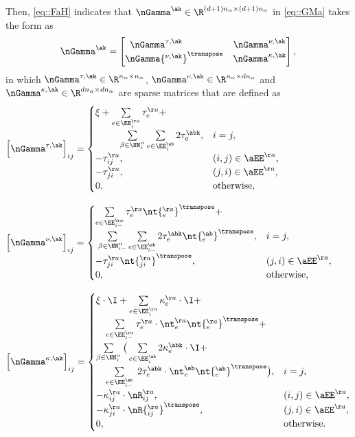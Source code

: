Then, \cref{eq::FaH} indicates that $\nGamma^{\ak}\in \R^{(d+1)n_\alpha\times (d+1)n_\alpha}$ in \cref{eq::GMa} takes the form as
\begin{equation}\label{eq::nGamma}
\nGamma^{\ak}=\begin{bmatrix}
\nGamma^{\tau,\ak}\hphantom{{}^\transpose} & \nGamma^{\nu,\ak}\\
\nGamma{\vphantom{H}^{\nu,\ak}}^\transpose & \nGamma^{\kappa,\ak}
\end{bmatrix},
\end{equation}
in which $\nGamma^{\tau,\ak}\in \R^{n_\alpha\times n_\alpha}$, $\nGamma^{\nu,\ak}\in\R^{n_\alpha\times dn_\alpha}$ and $\nGamma^{\kappa,\ak}\in\R^{dn_\alpha\times dn_\alpha}$ are sparse matrices that are defined as
\begingroup
\allowdisplaybreaks
\begin{align*}
&\Big[\nGamma^{\tau,\ak}\Big]_{ij}=\begin{cases}
\xi + \sum\limits_{e\in \EE_i^{\aa}}\tau_{e}^{\aa}+\\
\quad\quad\;\;\sum\limits_{\substack{\beta\in \NN_i^\alpha}}\sum\limits_{e\in \EE_i^{\ab}}2\tau_e^{\abk}, & i=j,\\
-\tau_{ij}^{\aa}, & (i,j)\in \aEE^{\aa},\\
-\tau_{ji}^{\aa}, & (j,i)\in \aEE^{\aa},\\
0,& \text{otherwise,}
\end{cases}\\[0.8em]
&\Big[\nGamma^{\nu,\ak}\Big]_{ij}=\begin{cases}
\sum\limits_{e\in \EE_{i-}^{\aa}}\tau_{e}^{\aa}\nt{_{e}^{\aa}}^\transpose+\\
\;\sum\limits_{\substack{\beta\in \NN_{i-}^\alpha}}\sum\limits_{e\in \EE_{i-}^{\ab}}2\tau_e^{\abk}\nt{\vphantom{t}_{e}^{\ab}}^\transpose, & i=j,\\
-\tau_{ji}^{\aa}\nt{_{ji}^{\aa}}^\transpose, & (j,i)\in \aEE^{\aa},\\
0,& \text{otherwise,}
\end{cases}\\[0.8em]
&\Big[\nGamma^{\kappa,\ak}\Big]_{ij}=\begin{cases}
\xi\cdot\I+\sum\limits_{e\in \EE_i^{\aa}}\kappa_{e}^{\aa}\cdot\I+\\
\quad\sum\limits_{e\in \EE_{i-}^{\aa}}\tau_{e}^{\aa}\cdot\nt_{e}^{\aa}\nt{\vphantom{t}_{e}^{\aa}}^\transpose+\\
\sum\limits_{\substack{\beta\in \NN_i^\alpha}}\big(\sum\limits_{e\in \EE_i^{\ab}}2\kappa_e^{\abk}\cdot\I+\\
\quad\sum\limits_{e\in \EE_{i-}^{\ab}}\;2\tau_{e}^{\abk}\cdot\nt_{e}^{\ab}\nt{\vphantom{t}_{e}^{\ab}}^\transpose\big), & i=j,\\
-\kappa_{ij}^{\aa}\cdot\nR_{ij}^{\aa}, & (i,j)\in \aEE^{\aa},\\
-\kappa_{ji}^{\aa}\cdot\nR{\vphantom{R}_{ij}^{\aa}}^\transpose, & (j,i)\in \aEE^{\aa},\\
0,& \text{otherwise.}
\end{cases}
\end{align*}
\endgroup
